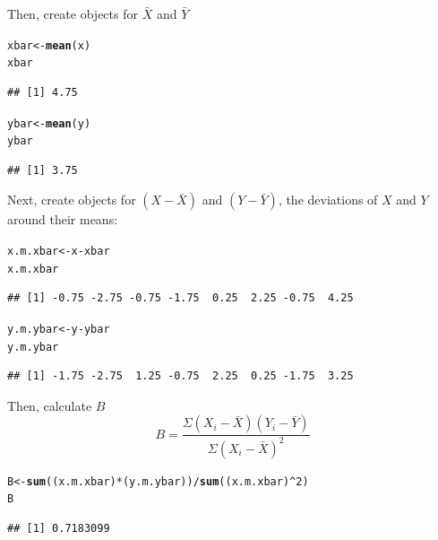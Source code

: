 \documentclass[11pt,openany]{book}\usepackage[]{graphicx}\usepackage[]{color}
\makeatletter
\newcommand{\hlnum}[1]{\textcolor[rgb]{0.686,0.059,0.569}{#1}}%
\newcommand{\hlopt}[1]{\textcolor[rgb]{0,0,0}{#1}}%
\newcommand{\hlstd}[1]{\textcolor[rgb]{0.345,0.345,0.345}{#1}}%
\newcommand{\hlkwb}[1]{\textcolor[rgb]{0.69,0.353,0.396}{#1}}%
\newcommand{\hlkwd}[1]{\textcolor[rgb]{0.737,0.353,0.396}{\textbf{#1}}}%
\newenvironment{kframe}{%
 \def\at@end@of@kframe{}%
 \ifinner\ifhmode%
  \def\at@end@of@kframe{\end{minipage}}%
  \begin{minipage}{\columnwidth}%
 \fi\fi%
 \def\FrameCommand##1{\hskip\@totalleftmargin \hskip-\fboxsep
 \colorbox{shadecolor}{##1}\hskip-\fboxsep
     \hskip-\linewidth \hskip-\@totalleftmargin \hskip\columnwidth}%
 \MakeFramed {\advance\hsize-\width
   \@totalleftmargin\z@ \linewidth\hsize
   \@setminipage}}%
 {\par\unskip\endMakeFramed%
 \at@end@of@kframe}
\newenvironment{knitrout}{}{} %
\renewenvironment{knitrout}{\begin{singlespace}}{\end{singlespace}}
\makeatother
\begin{document}
\noindent Then, create objects for $\bar {X}$ and $\bar {Y}$

\begin{knitrout}
\color{fgcolor}\begin{kframe}
\begin{alltt}
\hlstd{xbar} \hlkwb{<-} \hlkwd{mean}\hlstd{(x)}
\hlstd{xbar}
\end{alltt}
\begin{verbatim}
## [1] 4.75
\end{verbatim}
\begin{alltt}
\hlstd{ybar} \hlkwb{<-} \hlkwd{mean}\hlstd{(y)}
\hlstd{ybar}
\end{alltt}
\begin{verbatim}
## [1] 3.75
\end{verbatim}
\end{kframe}
\end{knitrout}

\noindent Next, create objects for $(X-\bar X)$ and $(Y-\bar Y)$, the deviations of $X$ and $Y$ around their means:

\begin{knitrout}
\color{fgcolor}\begin{kframe}
\begin{alltt}
\hlstd{x.m.xbar} \hlkwb{<-} \hlstd{x} \hlopt{-} \hlstd{xbar}
\hlstd{x.m.xbar}
\end{alltt}
\begin{verbatim}
## [1] -0.75 -2.75 -0.75 -1.75  0.25  2.25 -0.75  4.25
\end{verbatim}
\begin{alltt}
\hlstd{y.m.ybar} \hlkwb{<-} \hlstd{y} \hlopt{-} \hlstd{ybar}
\hlstd{y.m.ybar}
\end{alltt}
\begin{verbatim}
## [1] -1.75 -2.75  1.25 -0.75  2.25  0.25 -1.75  3.25
\end{verbatim}
\end{kframe}
\end{knitrout}

\noindent Then, calculate $B$
\begin{equation*}
B=\frac{\Sigma(X_{i}-\bar X)(Y_{i}-\bar Y)}{\Sigma(X_{i}-\bar X)^2}
\end{equation*}

\begin{knitrout}
\color{fgcolor}\begin{kframe}
\begin{alltt}
\hlstd{B} \hlkwb{<-} \hlkwd{sum}\hlstd{((x.m.xbar)} \hlopt{*} \hlstd{(y.m.ybar))}\hlopt{/}\hlkwd{sum}\hlstd{((x.m.xbar)}\hlopt{^}\hlnum{2}\hlstd{)}
\hlstd{B}
\end{alltt}
\begin{verbatim}
## [1] 0.7183099
\end{verbatim}
\end{kframe}
\end{knitrout}
\end{document}

